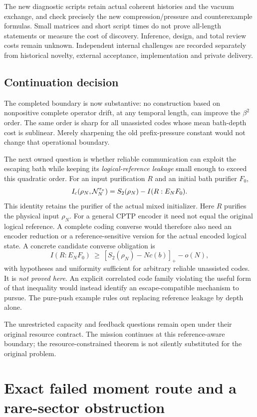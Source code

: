 \documentclass[11pt]{article}
\newcommand{\Ic}{I_{\rm c}}
\begin{document}
The new diagnostic scripts retain actual coherent histories and the
vacuum exchange, and check precisely the new compression/pressure and
counterexample formulas. Small matrices and short script times do not
prove all-length statements or measure the cost of discovery.
Inference, design, and total review costs remain unknown.
Independent internal challenges are recorded separately from historical
novelty, external acceptance, implementation and private delivery.

\subsection{Continuation decision}

The completed boundary is now substantive: no construction based on
nonpositive complete operator drift, at any temporal length, can improve
the \(\beta^2\) order. The same order is sharp for all unassisted codes
whose mean bath-depth cost is sublinear. Merely sharpening the old
prefix-pressure constant would not change that operational boundary.

The next owned question is whether reliable communication can exploit
the escaping bath while keeping its \emph{logical-reference leakage}
small enough to exceed this quadratic order.
For an input purification \(R\) and an initial bath purifier \(F_0\),
\[
 \Ic(\rho_N,\mathcal N_N^{\tau_\pi})
 =S_2(\rho_N)-I(R:E_NF_0).
\]
This identity retains the purifier of the actual mixed initializer.
Here \(R\) purifies the physical input \(\rho_N\). For a general CPTP
encoder it need not equal the original logical reference. A complete
coding converse would therefore also need an encoder reduction or a
reference-sensitive version for the actual encoded logical state.
A concrete candidate converse obligation is
\[
 I(R:E_NF_0)\ \ge\
 [S_2(\rho_N)-Nc(b)]_+-o(N),
\]
with hypotheses and uniformity sufficient for arbitrary reliable
unassisted codes. It is \emph{not proved here}. An explicit correlated
code family violating the useful form of that inequality would instead
identify an escape-compatible mechanism to pursue. The pure-push
example rules out replacing reference leakage by depth alone.

The unrestricted capacity and feedback questions remain open under
their original resource contract. The mission continues at this
reference-aware boundary; the resource-constrained theorem is not
silently substituted for the original problem.

\appendix
\section{Exact failed moment route and a rare-sector obstruction}
\end{document}
